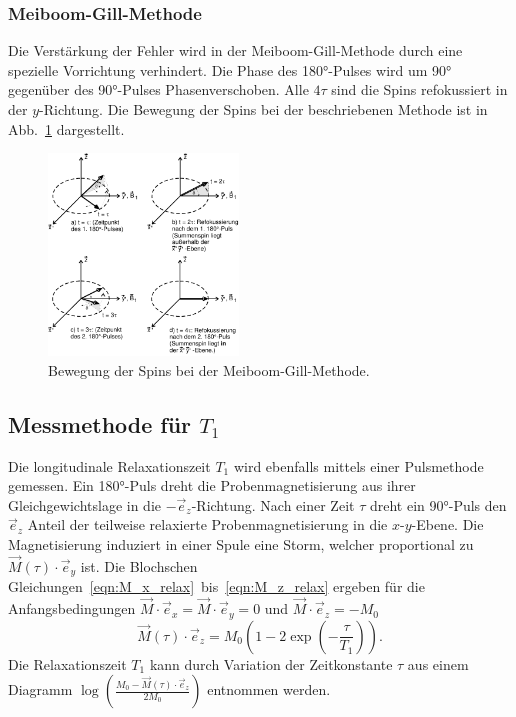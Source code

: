 \subsubsection{Meiboom-Gill-Methode}
\vspace{-15pt}
Die Verstärkung der Fehler wird in der Meiboom-Gill-Methode durch eine spezielle
Vorrichtung verhindert. Die Phase des 180°-Pulses wird um 90° gegenüber des
90°-Pulses Phasenverschoben. Alle $4\tau$ sind die Spins refokussiert in der
$y$-Richtung. Die Bewegung der Spins bei der beschriebenen Methode ist in
Abb.~\ref{fig:meiboom_gill} dargestellt.
\begin{figure}[h!]
  \centering
  \includegraphics[width = 0.45\textwidth]{Pics/meiboom.pdf}
  \caption{Bewegung der Spins bei der Meiboom-Gill-Methode\cite{anleitung}.}
  \label{fig:meiboom_gill}
\end{figure}
\FloatBarrier
\subsection{Messmethode für $T_1$}
Die longitudinale Relaxationszeit $T_1$ wird ebenfalls mittels einer Pulsmethode
gemessen. Ein 180°-Puls dreht die Probenmagnetisierung aus ihrer Gleichgewichtslage
in die $-\vec{e}_z$-Richtung. Nach einer Zeit $\tau$ dreht ein 90°-Puls
den $\vec{e}_z$ Anteil der teilweise relaxierte Probenmagnetisierung
in die $x$-$y$-Ebene. Die Magnetisierung induziert in einer Spule eine Storm,
welcher proportional zu $\vec{M}(\tau)\cdot\vec{e}_y$ ist.
Die Blochschen Gleichungen~\eqref{eqn:M_x_relax}~bis~\eqref{eqn:M_z_relax}
ergeben für die Anfangsbedingungen $\vec{M}\cdot\vec{e}_x = \vec{M}\cdot\vec{e}_y = 0$
und $\vec{M}\cdot\vec{e}_z = -M_0$
\begin{equation}
  \label{eqn:zeit_mag}
  \vec{M}(\tau)\cdot\vec{e}_z = M_0\left(1-2\exp{\left(-\frac{\tau}{T_1}\right)}\right).
\end{equation}
Die Relaxationszeit $T_1$ kann durch Variation der Zeitkonstante $\tau$
aus einem Diagramm $\log{\left(\frac{M_0 - \vec{M}(\tau)\cdot\vec{e}_z}{2M_0}\right)}$
entnommen werden.

